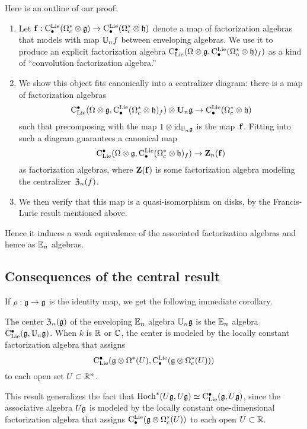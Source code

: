 \documentclass[11pt]{amsart}
\numberwithin{equation}{section}
\begin{document}
Here is an outline of our proof:
\begin{enumerate}
\item Let ${\bf f}: {\rm C}^{\rm Lie}_\bullet(\Omega_c^* \otimes \mathfrak g) \to {\rm C}^{\rm Lie}_\bullet(\Omega_c^* \otimes \mathfrak h)$ denote a map of factorization algebras that models with map $\mathbb U_n f$ between enveloping algebras. 
We use it to produce an explicit factorization algebra ${\rm C}_{\rm Lie}^\bullet(\Omega \otimes \mathfrak g, {\rm C}^{\rm Lie}_\bullet(\Omega_c^* \otimes \mathfrak h)_f)$ as a kind of ``convolution factorization algebra.'' 
\item We show this object fits canonically into a centralizer diagram: there is a map of factorization algebras
\[
{\rm C}_{\rm Lie}^\bullet(\Omega \otimes \mathfrak g, {\rm C}^{\rm Lie}_\bullet(\Omega_c^* \otimes \mathfrak h)_f) \otimes \mathbf U_n \mathfrak g \to {\rm C}^{\rm Lie}_\bullet(\Omega_c^* \otimes \mathfrak h)
\]
such that precomposing with the map $1 \otimes {\rm id}_{\mathbb U_n \mathfrak g}$ is the map~${\bf f}$.
Fitting into such a diagram guarantees a canonical map 
\[
{\rm C}_{\rm Lie}^\bullet(\Omega \otimes \mathfrak g, {\rm C}^{\rm Lie}_\bullet(\Omega_c^* \otimes \mathfrak h)_f) \to \mathbf Z_n({\bf f})
\]
as factorization algebras, where $\mathbf Z({\bf f})$ is some factorization algebra modeling the centralizer~${\frak Z}_n(f)$. 
\item We then verify that this map is a quasi-isomorphism on disks, by the Francis-Lurie result mentioned above. 
\end{enumerate}
Hence it induces a weak equivalence of the associated factorization algebras and hence as $\mathbb E_n$ algebras. 

\subsection{Consequences of the central result}

If $\rho: \mathfrak g \to \mathfrak g$ is the identity map, we get the following immediate corollary.

\begin{cor}
\label{thm: center}
The center ${\frak Z}_n(\mathfrak g)$ of the enveloping $\mathbb E_n$ algebra $\mathbb U_n\mathfrak g$ is the $\mathbb E_n$ algebra ${\rm C}_{\rm Lie}^\bullet(\mathfrak g, \mathbb U_n\mathfrak g)$. 
When $k$ is $\mathbb R$ or $\mathbb C$, the 
center is modeled by the locally constant factorization algebra that assigns
\[
{\rm C}_{\rm Lie}^\bullet(\mathfrak g \otimes \Omega^*(U), {\rm C}^{\rm Lie}_\bullet( \mathfrak g \otimes \Omega^*_c(U)))
\]
to each open set $U \subset \mathbb R^n$.
\end{cor}

This result generalizes the fact that ${\rm Hoch}^*(U\mathfrak g,U\mathfrak g) \simeq {\rm C}_{\rm Lie}^\bullet(\mathfrak g, U\mathfrak g)$, 
since the associative algebra $U\mathfrak g$ is modeled by the locally constant one-dimensional factorization algebra that assigns
${\rm C}^{\rm Lie}_\bullet (\mathfrak g \otimes \Omega^*_c(U))$ to each open $U \subset \mathbb R$. 
\end{document}
